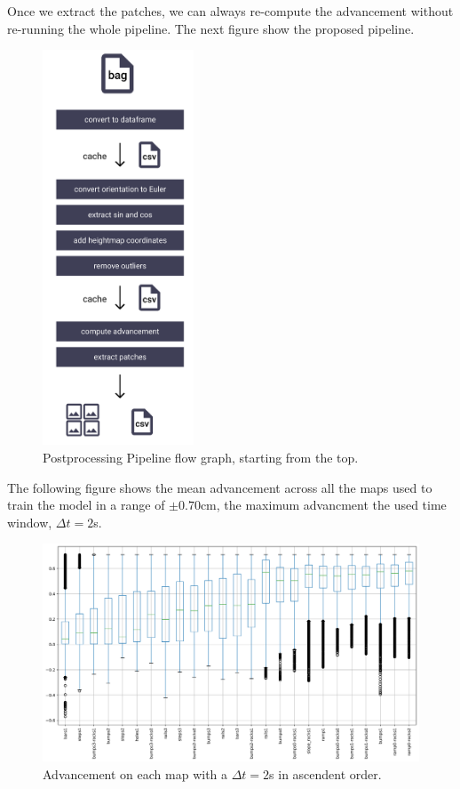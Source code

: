 \documentclass[../document.tex]{subfiles}
\begin{document}
Once we extract the patches, we can always re-compute the advancement without re-running the whole pipeline. The next figure show the proposed pipeline.
\begin{figure}[H] 
\centering
\includegraphics[width=0.4\textwidth]{../img/postprocessing-pipeline.png}
\caption{Postprocessing Pipeline flow graph, starting from the top.}
\label{fig: postprocessing-pipeline}
\end{figure}
The following figure shows the mean advancement across all the maps used to train the model in a range of $\pm 0.70$cm, the maximum advancment the used time window, $\Delta t = 2$s.
\begin{figure}[H]
    \centering
    \includegraphics[width=\linewidth]{../img/datasets/box_for_each_map.png}
    \caption{Advancement on each map with a $\Delta t = 2$s in ascendent order.}
\end{figure}
\end{document}
